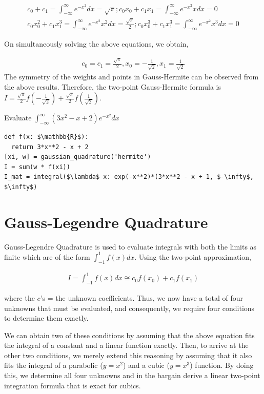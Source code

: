 \documentclass[book.tex]{subfiles}
\begin{document}
\begin{eqnarray*}
	c_0 + c_1 = \int_{-\infty}^{\infty}e^{-x^2}dx = \sqrt{\pi}; c_0x_0 + c_1x_1 = \int_{-\infty}^{\infty}e^{-x^2}xdx = 0 \\
	c_0x_0^2 + c_1x_1^3 = \int_{-\infty}^{\infty}e^{-x^2}x^2dx = \frac{ \sqrt{\pi}}{2};	c_0x_0^3 + c_1x_1^3 = \int_{-\infty}^{\infty}e^{-x^2}x^3dx = 0
\end{eqnarray*}

On simultaneously solving the above equations, we obtain,

\begin{align}
c_0 = c_1 = \frac{\sqrt{\pi}}{2}, x_0 = -\frac{1}{\sqrt{2}}, x_1 = \frac{1}{\sqrt{2}}
\end{align}
The symmetry of the weights and points in Gauss-Hermite can be observed from the above results. Therefore, the two-point Gauss-Hermite formula is $I = \frac{\sqrt{\pi}}{2}f(-\frac{1}{\sqrt{2}}) + \frac{\sqrt{\pi}}{2}f(\frac{1}{\sqrt{2}})$.


\begin{example}
Evaluate $ \int_{-\infty}^{\infty}(3x^2 - x + 2)e^{-x^2}dx$


\begin{lstlisting}
def f(x: $\mathbb{R}$):
  return 3*x**2 - x + 2
[xi, w] = gaussian_quadrature('hermite')
I = sum(w * f(xi))
I_mat = integral($\lambda$ x: exp(-x**2)*(3*x**2 - x + 1, $-\infty$, $\infty$)
\end{lstlisting}
\end{example}
	

\section{Gauss-Legendre Quadrature}
Gauss-Legendre Quadrature is used to evaluate integrals with both the limits as finite which are of the form $\int_{-1}^{1}f(x)dx$. Using the two-point approximation, 

\begin{align}
I = \int_{-1}^{1}f(x)dx \cong c_0f(x_0) + c_1f(x_1)
\end{align}

where the $c$’s = the unknown coefficients. Thus, we now have a total of four unknowns that must be evaluated, and consequently, we require four conditions to determine them exactly.

We can obtain two of these conditions by assuming that the above equation fits the integral of a constant and a linear function exactly. Then, to arrive at the other two conditions, we merely extend this reasoning by assuming that it also fits the integral of a parabolic ($y = x^2$) and a cubic ($y = x^3$) function. By doing this, we determine all four unknowns and in the bargain derive a linear two-point integration formula that is exact for cubics.
\end{document}
